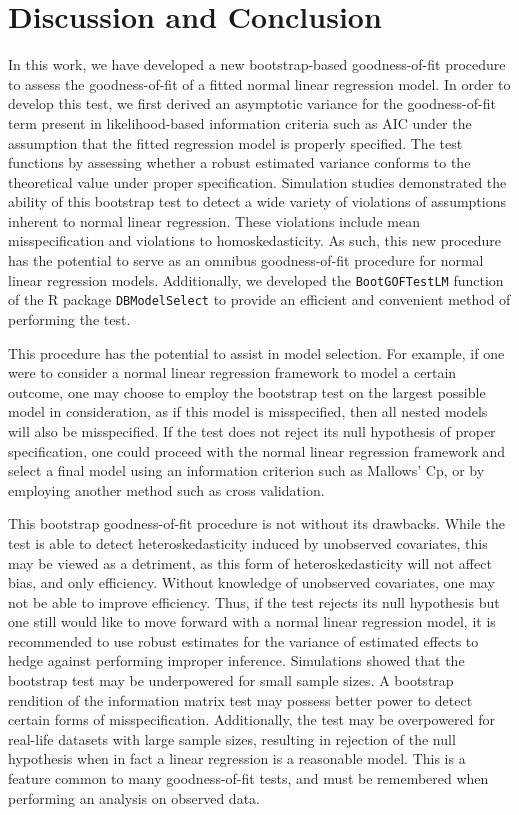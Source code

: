 \documentclass[12pt]{article} %
\theoremstyle{definition}
\begin{document}
\section{Discussion and Conclusion}

In this work, we have developed a new bootstrap-based goodness-of-fit procedure to assess the goodness-of-fit of a fitted normal linear regression model. In order
to develop this test, we first derived an asymptotic variance for the goodness-of-fit term present in likelihood-based information criteria such as AIC under the assumption
that the fitted regression model is properly specified. The test functions by assessing whether a robust estimated variance conforms to the
theoretical value under proper specification. Simulation studies demonstrated the ability of this bootstrap test to detect a wide variety of violations of assumptions inherent to
normal linear regression. These violations include mean misspecification and violations to homoskedasticity. As such, this new procedure has the potential to serve as an omnibus
goodness-of-fit procedure for normal linear regression models. Additionally, we developed the \verb|BootGOFTestLM| function of the R package \verb|DBModelSelect| to provide
an efficient and convenient method of performing the test.

This procedure has the potential to assist in model selection. For example, if one were to consider a normal linear regression framework to model a certain outcome, one may
choose to employ the bootstrap test on the largest possible model in consideration, as if this model is misspecified, then all nested models will also be misspecified.
If the test does not reject its null hypothesis of proper specification, one could proceed with the normal linear regression framework and select a final model using
an information criterion such as Mallows' Cp, or by employing another method such as cross validation.

This bootstrap goodness-of-fit procedure is not without its drawbacks. While the test is able to detect heteroskedasticity induced by unobserved covariates, this may be viewed as a detriment,
as this form of heteroskedasticity will not affect bias, and only efficiency. Without knowledge of unobserved covariates, one may not be able to improve efficiency. Thus, if the test rejects its
null hypothesis but one still would like  to move forward with a normal linear regression model, it is recommended to use robust estimates for the variance of estimated effects
to hedge against performing improper inference. Simulations showed that the bootstrap test may be underpowered for small sample sizes. A bootstrap rendition of the information matrix test may
possess better power to detect certain forms of misspecification. Additionally, the test may be overpowered for real-life datasets with large sample sizes, resulting in rejection of the null hypothesis
when in fact a linear regression is a reasonable model. This is a feature common to many goodness-of-fit tests, and must be remembered when performing an analysis on observed data.
\end{document}
